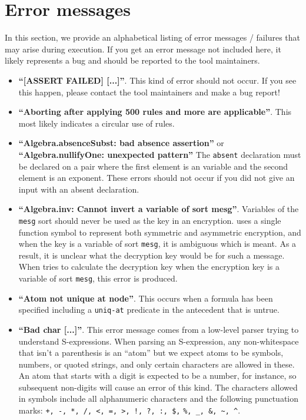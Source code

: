 \section{Error messages}
\label{sec:errors}

In this section, we provide an alphabetical listing of error messages
/ failures that may arise during {\cpsa} execution.  If you get an error
message not included here, it likely represents a bug and should be reported
to the tool maintainers.

\begin{itemize}
\item \textbf{``[ASSERT FAILED] [...]''}.  This kind of error should
  not occur.  If you see this happen, please contact the tool maintainers
  and make a bug report!

\item \textbf{``Aborting after applying 500 rules and more are
  applicable''}.  This most likely indicates a circular use of rules.

\item \textbf{``Algebra.absenceSubst: bad absence assertion''} or
  \textbf{``Algebra.nullifyOne: unexpected pattern''} The
  \texttt{absent} declaration must be declared on a pair where the
  first element is an  variable and the second element is 
  an exponent.
  These errors should not occur if you did not give {\cpsa} an input
  with an absent declaration.

\item \textbf{``Algebra.inv: Cannot invert a variable of sort mesg''}.
  Variables of the \texttt{mesg} sort should never be used as the key
  in an encryption.  {\cpsa} uses a single function symbol to represent
  both symmetric and asymmetric encryption, and when the key is a variable
  of sort \texttt{mesg}, it is ambiguous which is meant.  As a result,
  it is unclear what the decryption key would be for such a message.  When
  {\cpsa} tries to calculate the decryption key when the encryption key
  is a variable of sort \texttt{mesg}, this error is produced.

\item \textbf{``Atom not unique at node''}.  This occurs when a
  formula has been specified including a \texttt{uniq-at} predicate in
  the antecedent that is untrue.

\item \textbf{``Bad char [...]''}.  This error message comes from a
  low-level parser trying to understand S-expressions.  When parsing
  an S-expression, any non-whitespace that isn't a parenthesis is an
  ``atom'' but we expect atoms to be symbols, numbers, or quoted
  strings, and only certain characters are allowed in these.  An atom
  that starts with a digit is expected to be a number, for instance, so
  subsequent non-digits will cause an error of this kind.  The characters
  allowed in symbols include all alphanumeric characters and the following
  punctuation marks: \verb|+, -, *, /, <, =, >, !, ?, :, $,|  \verb|%, _, &, ~, ^|.


\end{itemize}

